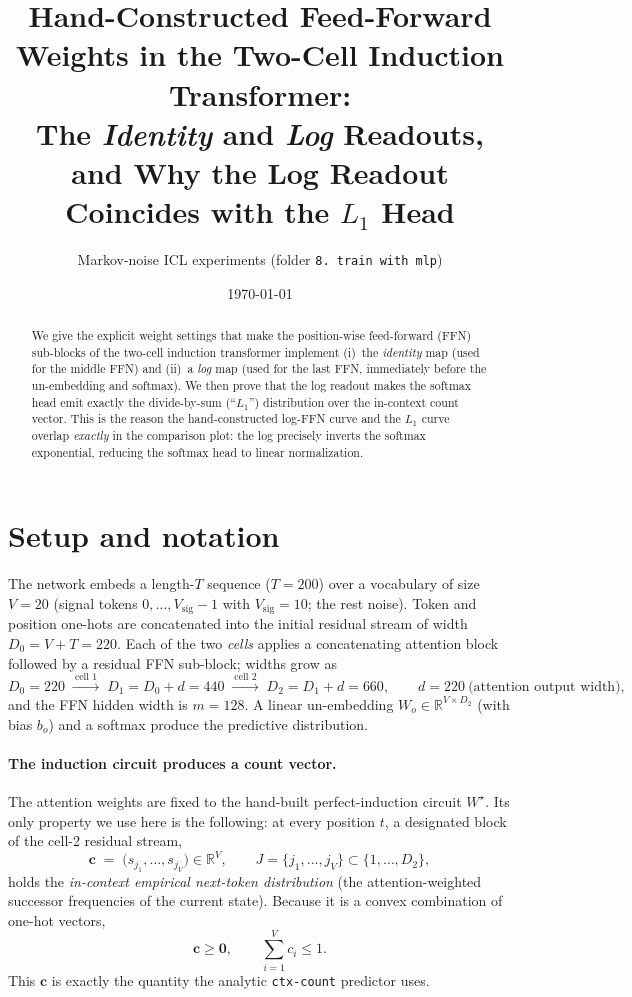 \documentclass[11pt]{article}
\title{Hand-Constructed Feed-Forward Weights in the Two-Cell Induction Transformer:\\
The \emph{Identity} and \emph{Log} Readouts, and Why the Log Readout Coincides with the $L_1$ Head}
\author{Markov-noise ICL experiments (folder \texttt{8. train with mlp})}
\date{\today}
\theoremstyle{remark}
\newcommand{\R}{\mathbb{R}}
\newcommand{\ve}[1]{\bm{#1}}
\begin{document}
\maketitle

\begin{abstract}
We give the explicit weight settings that make the position-wise feed-forward (FFN)
sub-blocks of the two-cell induction transformer implement (i)~the \emph{identity} map
(used for the middle FFN) and (ii)~a \emph{log} map (used for the last FFN, immediately
before the un-embedding and softmax). We then prove that the log readout makes the
softmax head emit exactly the divide-by-sum (``$L_1$'') distribution over the
in-context count vector. This is the reason the hand-constructed log-FFN curve and the
$L_1$ curve overlap \emph{exactly} in the comparison plot: the log precisely inverts the
softmax exponential, reducing the softmax head to linear normalization.
\end{abstract}

\section{Setup and notation}

The network embeds a length-$T$ sequence ($T=200$) over a vocabulary of size $V=20$
(signal tokens $0,\dots,V_{\mathrm{sig}}-1$ with $V_{\mathrm{sig}}=10$; the rest noise).
Token and position one-hots are concatenated into the initial residual stream of width
$D_0=V+T=220$. Each of the two \emph{cells} applies a concatenating attention block
followed by a residual FFN sub-block; widths grow as
\[
D_0=220 \;\xrightarrow{\ \text{cell 1}\ }\; D_1=D_0+d=440
\;\xrightarrow{\ \text{cell 2}\ }\; D_2=D_1+d=660 ,
\qquad d=220\ \text{(attention output width)} ,
\]
and the FFN hidden width is $m=128$. A linear un-embedding
$W_o\in\R^{V\times D_2}$ (with bias $b_o$) and a softmax produce the predictive
distribution.

\paragraph{The induction circuit produces a count vector.}
The attention weights are fixed to the hand-built perfect-induction circuit $W^\star$.
Its only property we use here is the following: at every position $t$, a designated
block of the cell-2 residual stream,
\[
\ve c \;=\; \big(s_{j_1},\dots,s_{j_V}\big)\in\R^{V},\qquad J=\{j_1,\dots,j_V\}\subset\{1,\dots,D_2\},
\]
holds the \emph{in-context empirical next-token distribution} (the attention-weighted
successor frequencies of the current state). Because it is a convex combination of
one-hot vectors,
\begin{equation}\label{eq:c}
\ve c \ge \ve 0, \qquad \textstyle\sum_{i=1}^{V} c_i \le 1 .
\end{equation}
This $\ve c$ is exactly the quantity the analytic \texttt{ctx-count} predictor uses.
\end{document}
